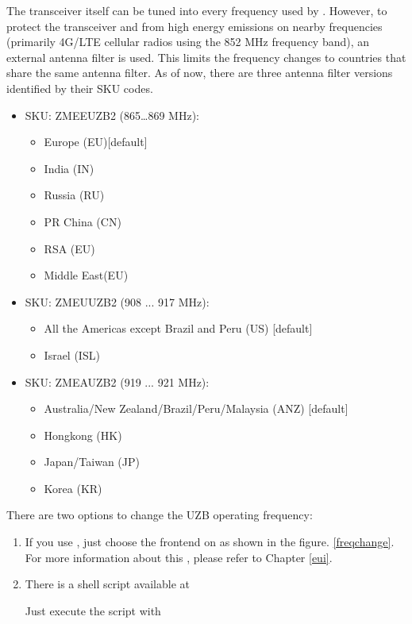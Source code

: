 The \zwave transceiver itself can be tuned into every frequency used by \zwave. However, 
to protect the transceiver and \zwave from high energy emissions on nearby frequencies 
(primarily 4G/LTE cellular radios using the 852 MHz frequency band), an external antenna 
filter is used. This limits the frequency changes to countries that share the same 
antenna filter. As of now, there are three antenna filter versions identified by 
their SKU codes.

\begin{itemize}
\item SKU: ZMEEUZB2 (865…869 MHz):
\begin{itemize}
\item Europe (EU)[default]
\item India (IN)
\item Russia (RU)
\item PR China (CN)
\item RSA (EU)
\item Middle East(EU)
\end{itemize}
\item SKU: ZMEUUZB2 (908 ... 917 MHz):
\begin{itemize}
\item All the Americas except Brazil and Peru (US) [default]
\item Israel (ISL)
\end{itemize}
\item SKU: ZMEAUZB2 (919 ... 921 MHz):
\begin{itemize}
\item Australia/New Zealand/Brazil/Peru/Malaysia (ANZ) [default]
\item Hongkong (HK)
\item Japan/Taiwan (JP)
\item Korea (KR)
\end{itemize}
\end{itemize}

There are two options to change the UZB operating frequency:

\begin{enumerate}
\item If you use \zweui, just choose the frontend on  as shown in the figure.
\ref{freqchange}. For more information about this \zweui, please refer to Chapter \ref{eui}.
\item There is a shell script available at 

Just execute the script with

\begin{quote}
\end{quote}

\end{enumerate}

